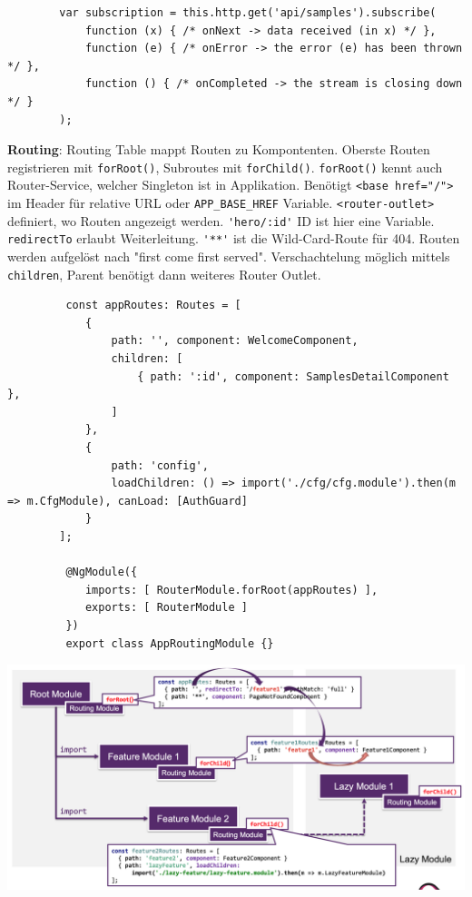 \documentclass[10pt,landscape]{article}
\begin{document}
\begin{multicols}{3}
        \begin{lstlisting}
        var subscription = this.http.get('api/samples').subscribe(
            function (x) { /* onNext -> data received (in x) */ },
            function (e) { /* onError -> the error (e) has been thrown */ },
            function () { /* onCompleted -> the stream is closing down */ }
        );
        \end{lstlisting}

        \textbf{Routing}: Routing Table mappt Routen zu Kompontenten.
        Oberste Routen registrieren mit \lstinline{forRoot()}, Subroutes mit \lstinline{forChild()}.
        \lstinline{forRoot()} kennt auch Router-Service, welcher Singleton ist in Applikation.
        Benötigt \lstinline{<base href="/">} im Header für relative URL oder \lstinline{APP_BASE_HREF} Variable.
        \lstinline{<router-outlet>} definiert, wo Routen angezeigt werden.
        \lstinline{'hero/:id'} ID ist hier eine Variable.
        \lstinline{redirectTo} erlaubt Weiterleitung.
        \lstinline{'**'} ist die Wild-Card-Route für 404.
        Routen werden aufgelöst nach "first come first served".
        Verschachtelung möglich mittels \lstinline{children}, Parent benötigt dann weiteres Router Outlet.

        \begin{lstlisting}
         const appRoutes: Routes = [
            {
                path: '', component: WelcomeComponent,
                children: [
                    { path: ':id', component: SamplesDetailComponent },
                ]
            },
            {
                path: 'config',
                loadChildren: () => import('./cfg/cfg.module').then(m => m.CfgModule), canLoad: [AuthGuard]
            }
        ];

         @NgModule({
            imports: [ RouterModule.forRoot(appRoutes) ],
            exports: [ RouterModule ]
         })
         export class AppRoutingModule {}
         \end{lstlisting}

        \includegraphics[width=\linewidth]{angular_routing}


\end{multicols}
\end{document}
